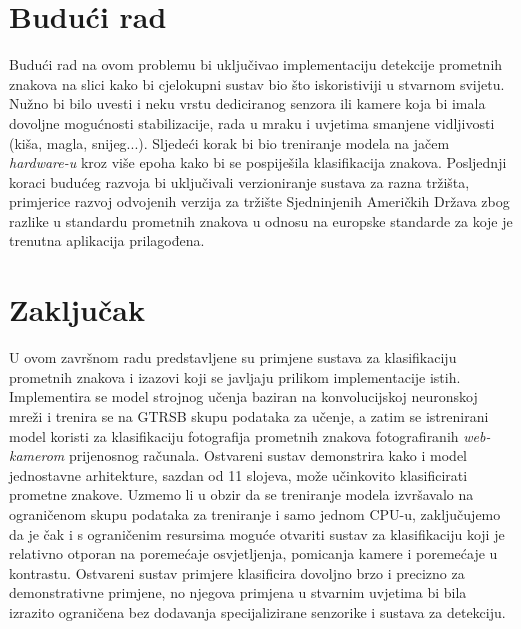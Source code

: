 \documentclass[times, utf8, zavrsni]{fer}
\begin{document}
\chapter{Budući rad}
Budući rad na ovom problemu bi uključivao implementaciju detekcije prometnih znakova na slici kako bi cjelokupni sustav bio što iskoristiviji u stvarnom svijetu. Nužno bi bilo uvesti i neku vrstu dediciranog senzora ili kamere koja bi imala dovoljne mogućnosti stabilizacije, 
rada u mraku i uvjetima smanjene vidljivosti (kiša, magla, snijeg...). Sljedeći korak bi bio treniranje modela na jačem \emph{hardware-u} kroz više epoha kako bi se pospiješila klasifikacija znakova. Posljednji koraci budućeg razvoja bi uključivali verzioniranje sustava za razna tržišta, primjerice
razvoj odvojenih verzija za tržište Sjedninjenih Američkih Država zbog razlike u standardu prometnih znakova u odnosu na europske standarde za koje je trenutna aplikacija prilagođena.

\chapter{Zaključak}
U ovom završnom radu predstavljene su primjene sustava za klasifikaciju prometnih znakova i izazovi koji se javljaju prilikom implementacije istih. Implementira se model strojnog učenja baziran na konvolucijskoj neuronskoj mreži i trenira se na GTRSB skupu podataka za učenje, 
a zatim se istrenirani model koristi za klasifikaciju fotografija prometnih znakova fotografiranih \emph{web-kamerom} prijenosnog računala. Ostvareni sustav demonstrira kako i model jednostavne arhitekture, sazdan od 11 slojeva, može učinkovito klasificirati prometne znakove.
Uzmemo li u obzir da se treniranje modela izvršavalo na ograničenom skupu podataka za treniranje i samo jednom CPU-u, zaključujemo da je čak i s ograničenim resursima moguće otvariti sustav za klasifikaciju koji je relativno otporan na poremećaje osvjetljenja, pomicanja kamere i poremećaje u kontrastu.
Ostvareni sustav primjere klasificira dovoljno brzo i precizno za demonstrativne primjene, no njegova primjena u stvarnim uvjetima bi bila izrazito ograničena bez dodavanja specijalizirane senzorike i sustava za detekciju. 
\end{document}
